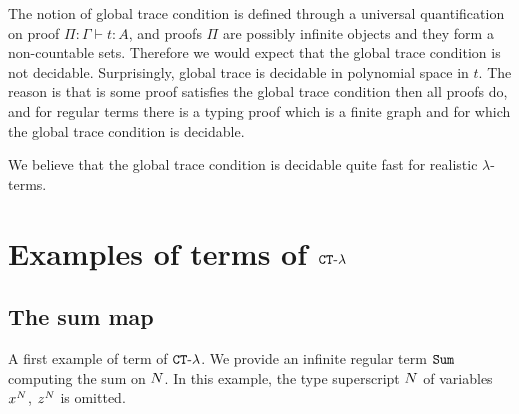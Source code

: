 \documentclass{article}
\begin{document}
The notion of global trace condition is defined through a universal quantification on proof 
$\Pi:\Gamma \vdash t:A$, and proofs $\Pi$ are possibly infinite objects and they form 
a non-countable sets.
Therefore we would expect that the global trace condition is not decidable. 
Surprisingly, global trace is decidable in polynomial space in $t$. The reason is that is some proof satisfies
the global trace condition then all proofs do, and for regular terms there is a typing proof
which is a finite graph and for which the global trace condition is decidable.

We believe that the global trace condition is decidable quite fast
for realistic $\lambda$-terms.


\section{Examples of terms of ${ {\tt CT} \mbox{-} \lambda}$}

\subsection{The sum map}
A first example of term of  ${ {\tt CT} \mbox{-} \lambda}$. 
We provide an infinite regular term ${\tt Sum}$ computing the sum on ${N}$.
In this example, the type superscript ${N}$ of variables $x^{N}$, $z^{N}$ is omitted.
\end{document}
